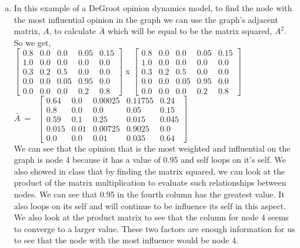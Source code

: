 \documentclass[11pt]{article}
\begin{document}
{\begin{enumerate}
\begin{enumerate}[(a)]
		=
		0.0(1)+0.0(1)+0.0(0.5)+0.2(0.0)+0.8(0.0)=0.0\\ \\  
So we have are opinion vector at the first time step, $t=1$.  This gives us,\\
		$x(t) \ = \ $
		$\begin{bmatrix} 
			0.8  \\ 1  \\ 0.75  \\ 0.025 \\ 0.0 \\
		\end{bmatrix}$
		\item In this example of a  DeGroot opinion dynamics model, to find the node with the most influential opinion in the graph we can use the graph's adjacent matrix, $A$, to  calculate $\bar{A}$ which will be equal to be the matrix squared, $A^2$.  So we get,\\
		$\begin{bmatrix} 
			0.8  & 0.0  & 0.0  & 0.05 & 0.15 \\
			1.0  & 0.0  & 0.0  & 0.0   & 0.0 \\
			0.3  & 0.2  & 0.5  & 0.0   & 0.0 \\
			0.0  & 0.0  & 0.05 & 0.95 & 0.0 \\
			0.0  & 0.0  & 0.0  & 0.2  & 0.8 
		\end{bmatrix}$
		x
		$\begin{bmatrix} 
			0.8  & 0.0  & 0.0  & 0.05 & 0.15 \\
			1.0  & 0.0  & 0.0  & 0.0   & 0.0 \\
			0.3  & 0.2  & 0.5  & 0.0   & 0.0 \\
			0.0  & 0.0  & 0.05 & 0.95 & 0.0 \\
			0.0  & 0.0  & 0.0  & 0.2  & 0.8 
		\end{bmatrix}$\\
                   $ \bar{A} \ = \ $
		$\begin{bmatrix} 
			0.64  	& 0.0   	& 0.00025 	& 0.11755    & 0.24 \\
			0.8    	& 0.0   	& 0.0   	& 0.05  	& 0.15\\
			0.59  	& 0.1  	& 0.25 	& 0.015   	& 0.045 \\
			0.015 	& 0.01   	& 0.00725   	& 0.9025 	& 0.0 \\
			0.0    	& 0.0   	& 0.01   	& 0.035     	& 0.64 
		\end{bmatrix}$\\
We can see that the opinion that is the most weighted and influential on the graph is node 4 because it has a value of 0.95 and self loops on it's self.  We also showed in class that by finding the matrix squared, we can look at the product of the matrix multiplication to evaluate such relationships between nodes.  We can see that 0.95 in the fourth column has the greatest value. It also loops on its self and will continue to be influence its self in this aspect.  We also look at the product matrix to see that the column for node 4 seems to converge to a larger value. These two factors are enough information for us to see that the node with the most influence would be node 4.\\

\end{enumerate}
\end{enumerate}}
\end{document}
